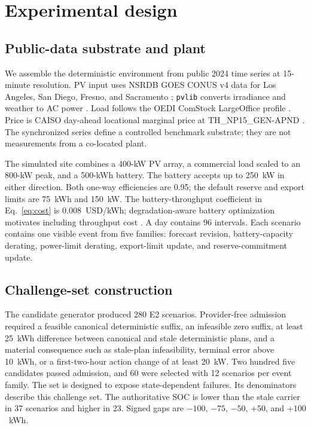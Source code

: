 \documentclass[11pt]{article}
\begin{document}
\section{Experimental design}
\label{sec:method}

\subsection{Public-data substrate and plant}

We assemble the deterministic environment from public 2024 time series at 15-minute resolution. PV input
uses NSRDB GOES CONUS v4 data for Los Angeles, San Diego, Fresno, and Sacramento
\cite{sengupta2018nsrdb}; \texttt{pvlib} converts irradiance and weather to AC power
\cite{anderson2023pvlib}. Load follows the OEDI ComStock LargeOffice profile
\cite{wilson2021eulp,parker2023comstock}. Price is CAISO day-ahead locational marginal price at
TH\_NP15\_GEN-APND \cite{caiso2017oasis}. The synchronized series define a controlled benchmark
substrate; they are not measurements from a co-located plant.

The simulated site combines a 400-kW PV array, a commercial load scaled to an 800-kW peak, and a
500-kWh battery. The battery accepts up to 250~kW in either direction. Both one-way efficiencies
are 0.95; the default reserve and export limits are 75~kWh and 150~kW. The battery-throughput
coefficient in Eq.~\eqref{eq:cost} is
0.008~USD/kWh; degradation-aware battery optimization motivates including throughput cost \cite{sarker2017battery}. A day contains 96 intervals. Each scenario contains one visible event from five
families: forecast revision, battery-capacity derating, power-limit derating, export-limit update,
and reserve-commitment update.

\subsection{Challenge-set construction}

The candidate generator produced 280 E2 scenarios. Provider-free admission required a feasible
canonical deterministic suffix, an infeasible zero suffix, at least 25~kWh difference between
canonical and stale deterministic plans, and a material consequence such as stale-plan
infeasibility, terminal error above 10~kWh, or a first-two-hour action change of at least 20~kW.
Two hundred five candidates passed admission, and 60 were selected with 12 scenarios per event
family. The set is designed to expose state-dependent failures. Its denominators describe this
challenge set. The authoritative SOC is lower than the stale carrier in 37 scenarios and higher in
23. Signed gaps are $-100$, $-75$, $-50$, $+50$, and $+100$~kWh.
\end{document}
